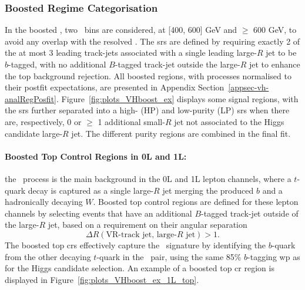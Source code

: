 \subsubsection{Boosted Regime Categorisation}
In the boosted \vhb, two \ptv\ bins are considered, at [400, 600] GeV and $\geq$ 600 GeV, to avoid any overlap with the resolved \vhb. The \glspl{sr} are defined by requiring exactly 2 of the at most 3 leading track-jets associated with a single leading large-$R$ jet to be $b$-tagged, with no additional $B$-tagged track-jet outside the large-$R$ jet to enhance the top background rejection. All boosted regions, with processes normalised to their postfit expectations, are presented in Appendix Section~\ref{appsec-vh-analRegPosfit}. Figure~\ref{fig:plots_VHboost_ex} displays some signal regions, with the \glspl{sr} further separated into a high- (HP) and low-purity (LP) \glspl{sr} when there are, respectively, 0 or $\geq$ 1 additional small-$R$ jet not associated to the Higgs candidate large-$R$ jet. The different purity regions are combined in the final fit.

\paragraph{Boosted Top Control Regions in 0L and 1L:} the \ttb\ process is the main background in the 0L and 1L lepton channels, where a $t$-quark decay is captured as a single large-$R$ jet merging the produced $b$ and a hadronically decaying $W$. Boosted top control regions are defined for these lepton channels by selecting events that have an additional $B$-tagged track-jet outside of the large-$R$ jet, based on a requirement on their angular separation \[\Delta R(\textrm{VR-track jet, large-}R\textrm{ jet}) > 1.\] The boosted top \glspl{cr} effectively capture the \ttb\ signature by identifying the $b$-quark from the other decaying $t$-quark in the \ttb\ pair, using the same 85\% $b$-tagging \gls{wp} as for the Higgs candidate selection. An example of a boosted top \gls{cr} region is displayed in Figure~\ref{fig:plots_VHboost_ex_1L_top}.\\

